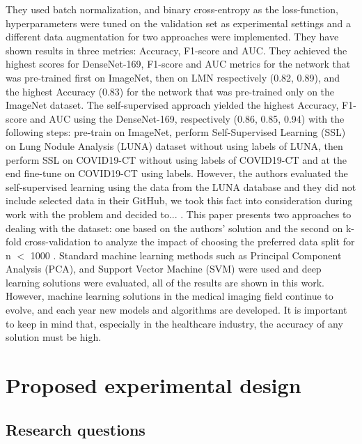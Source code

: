 \documentclass[runningheads]{llncs}
\begin{document}
They used batch normalization, and binary cross-entropy as the loss-function, hyperparameters were tuned on the validation set as experimental settings and a different data augmentation for two approaches were implemented. They have shown results in three metrics: Accuracy, F1-score and AUC.
They achieved the highest scores for DenseNet-169, F1-score and AUC metrics for the network that was pre-trained first on ImageNet, then on LMN respectively (0.82, 0.89), and the highest Accuracy (0.83) for the network that was pre-trained only on the ImageNet dataset. 
The self-supervised approach yielded the highest Accuracy, F1-score and AUC using the DenseNet-169, respectively (0.86, 0.85, 0.94) with the following steps: pre-train on ImageNet, perform Self-Supervised Learning (SSL) on Lung Nodule Analysis (LUNA) dataset without using labels of LUNA, then perform SSL on COVID19-CT without using labels of COVID19-CT and at the end fine-tune on COVID19-CT using labels. However, the authors evaluated the self-supervised learning using the data from the LUNA database and they did not include selected data in their GitHub, we took this fact into consideration during work with the problem and decided to... .  
\newline
\indent
This paper presents two approaches to dealing with the dataset: one based on the authors' solution and the second on k-fold cross-validation to analyze the impact of choosing the preferred data split for n $<$ 1000 \cite{kfoldcrossvalidationN1000}. Standard machine learning methods such as Principal Component Analysis (PCA), and Support Vector Machine (SVM) were used and deep learning solutions were evaluated, all of the results are shown in this work. However, machine learning solutions in the medical imaging field continue to evolve, and each year new models and algorithms are developed. It is important to keep in mind that, especially in the healthcare industry, the accuracy of any solution must be high.

\section{Proposed experimental design}
\subsection{Research questions}
\end{document}
